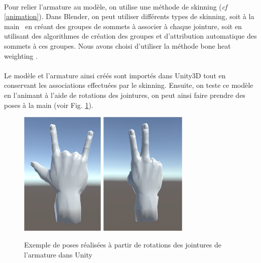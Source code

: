 \paragraph{}
Pour relier l'armature au modèle, on utilise une méthode de \og skinning \fg (\textit{cf} \ref{animation}). Dans Blender, on peut utiliser différents types de skinning, 
soit \og à la main \fg \ en créant des groupes de sommets à associer à chaque jointure, soit en utilisant des algorithmes de création des groupes et d'attribution automatique des 
sommets à ces groupes. Nous avons choisi d'utiliser la méthode \og bone heat weighting \fg \cite{baran2007automatic}. 

\paragraph{}
Le modèle et l'armature ainsi créés sont importés dans Unity3D tout en conservant les associations effectuées par le skinning. 
Ensuite, on teste ce modèle en l'animant à l'aide de rotations des jointures, on peut ainsi faire prendre des poses à la main (voir Fig. \ref{fig:poseMain}). 

\begin{figure}[!h]
	\centering
	\includegraphics[height=6cm]{images/HandPose1.png}
	\includegraphics[height=6cm]{images/HandPose2.png}
	\caption{Exemple de poses réalisées à partir de rotations des jointures de l'armature dans Unity}
	\label{fig:poseMain}
\end{figure}

